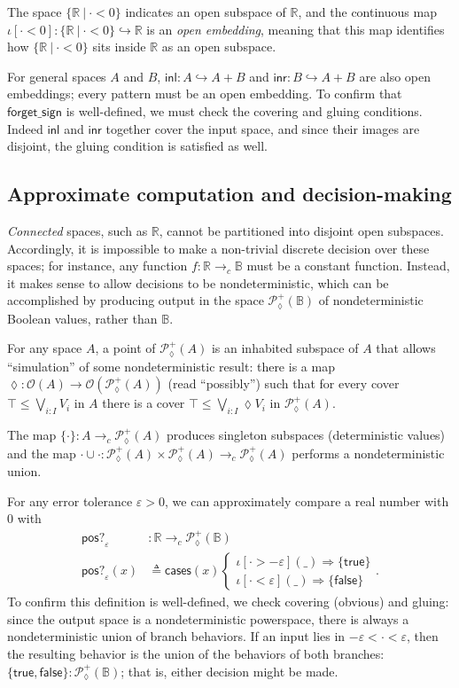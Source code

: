 \documentclass[conference]{IEEEtran}
\newcommand{\PLower}{\mathcal{P}_\lozenge}
\newcommand{\hookto}{\hookrightarrow}
\newcommand{\cto}{\to_c}
\newcommand{\R}{\mathbb{R}}
\newcommand{\suchthat}{\ |\ }
\newcommand{\Open}[1]{\mathcal{O}({#1})}
\newcommand{\bool}{\mathbb{B}}
\newcommand{\wildcard}{\_}
\newcommand{\oinclf}[1]{\iota[{#1}]}
\newcommand{\oincl}[2]{\oinclf{#1} \left({#2}\right)}
\newcommand{\Branch}{\Rightarrow}
\begin{document}
The space $\{ \R \suchthat \cdot < 0 \}$ indicates an open subspace of $\R$, and the continuous map $\oinclf{\cdot < 0} : \{ \R \suchthat \cdot < 0 \} \hookto \R$ is an \emph{open embedding}, meaning that this map identifies how $\{ \R \suchthat \cdot < 0 \}$ sits inside $\R$ as an open subspace.

For general spaces $A$ and $B$, $\mathsf{inl} : A \hookto A + B$ and $\mathsf{inr} : B \hookto A + B$ are also open embeddings; every pattern must be an open embedding. To confirm that $\mathsf{forget\_sign}$ is well-defined, we must check the covering and gluing conditions. Indeed $\mathsf{inl}$ and $\mathsf{inr}$ together cover the input space, and since their images are disjoint, the gluing condition is satisfied as well.

\subsection{Approximate computation and decision-making}
\label{s:ex:approx}

\emph{Connected} spaces, such as $\R$, cannot be partitioned into disjoint open subspaces. Accordingly, it is impossible to make a non-trivial discrete decision over these spaces; for instance, any function $f : \R \cto \bool$ must be a constant function. Instead, it makes sense to allow decisions to be nondeterministic, which can be accomplished by producing output in the space $\PLower^+(\bool)$ of nondeterministic Boolean values, rather than $\bool$.

For any space $A$, a point of $\PLower^+(A)$ is an inhabited subspace of $A$ that allows ``simulation'' of some nondeterministic result: there is a map $\lozenge : \Open{A} \to \Open{\PLower^+(A)}$ (read ``possibly'') such that for every cover $\top \le \bigvee_{i : I} V_i$ in $A$ there is a cover $\top \le \bigvee_{i : I} \lozenge V_i$ in $\PLower^+(A)$. 

The map $\{ \cdot \} : A \cto \PLower^+(A)$ produces singleton subspaces (deterministic values) and the map $\cdot \cup \cdot : \PLower^+(A) \times \PLower^+(A) \cto \PLower^+(A)$ performs a nondeterministic union.

For any error tolerance $\varepsilon > 0$, we can approximately compare a real number with 0 with
\begin{align*}
\mathsf{pos?}_\varepsilon &: \R \cto \PLower^+(\bool)
\\ \mathsf{pos?}_\varepsilon(x) &\triangleq \mathsf{cases}(x)
\begin{cases}
\oincl{\cdot > - \varepsilon}{\wildcard} \Branch \{ \mathsf{true} \}
\\ \oincl{\cdot < \varepsilon}{\wildcard} \Branch \{ \mathsf{false} \}
\end{cases}.
\end{align*}
To confirm this definition is well-defined, we check covering (obvious) and gluing: since the output space is a nondeterministic powerspace, there is always a nondeterministic union of branch behaviors. If an input lies in $- \varepsilon < \cdot < \varepsilon$, then the resulting behavior is the union of the behaviors of both branches: $\{ \mathsf{true}, \mathsf{false} \} : \PLower^+(\bool)$; that is, either decision might be made.
\end{document}
